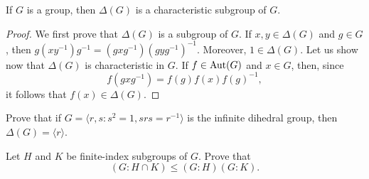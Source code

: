 \begin{proposition}
	If $G$ is a group, then $\Delta(G)$ 
	is a characteristic subgroup of $G$.
\end{proposition}

\begin{proof}
	We first prove that $\Delta(G)$ is a subgroup of $G$. If $x,y\in\Delta(G)$
	and $g\in G$, then $g(xy^{-1})g^{-1}=(gxg^{-1})(gyg^{-1})^{-1}$. Moreover, 
	$1\in\Delta(G)$. Let us show now that $\Delta(G)$ is characteristic in $G$. If 
	$f\in\operatorname{Aut}(G)$ and $x\in G$, then, since 
	\[
	f(gxg^{-1})=f(g)f(x)f(g)^{-1},
	\]
	it follows that $f(x)\in\Delta(G)$.
\end{proof}

\begin{exercise}
	Prove that if $G=\langle r,s:s^2=1,srs=r^{-1}\rangle$ is the
	infinite dihedral group, then $\Delta(G)=\langle r\rangle$.
\end{exercise}

\begin{exercise}
	Let $H$ and $K$ be finite-index subgroups of $G$. Prove that
	\[
	(G:H\cap K)\leq (G:H)(G:K). 
	\]
\end{exercise}

